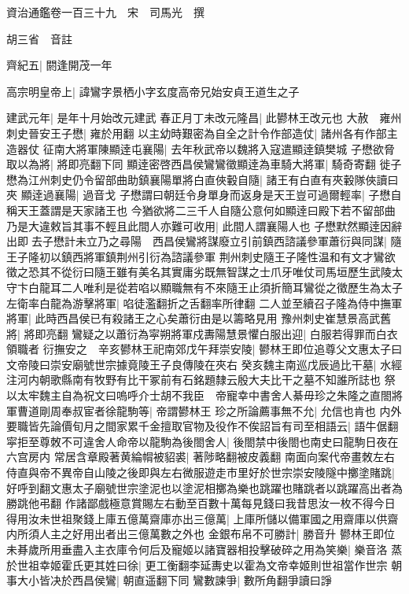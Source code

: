 資治通鑑卷一百三十九　宋　司馬光　撰

胡三省　音註

齊紀五|{
	閼逢開茂一年}


高宗明皇帝上|{
	諱鸞字景栖小字玄度高帝兄始安貞王道生之子}


建武元年|{
	是年十月始改元建武}
春正月丁未改元隆昌|{
	此鬰林王改元也}
大赦　雍州刺史晉安王子懋|{
	雍於用翻}
以主幼時艱密為自全之計令作部造仗|{
	諸州各有作部主造器仗}
征南大將軍陳顯逹屯襄陽|{
	去年秋武帝以魏將入寇遣顯逹鎮樊城}
子懋欲脅取以為將|{
	將即亮翻下同}
顯逹密啓西昌侯鸞鸞徵顯逹為車騎大將軍|{
	騎奇寄翻}
徙子懋為江州刺史仍令留部曲助鎮襄陽單將白直俠轂自隨|{
	諸王有白直有夾轂隊俠讀曰夾}
顯逹過襄陽|{
	過音戈}
子懋謂曰朝廷令身單身而返身是天王豈可過爾輕率|{
	子懋自稱天王蓋謂是天家諸王也}
今猶欲將二三千人自隨公意何如顯逹曰殿下若不留部曲乃是大違敕旨其事不輕且此間人亦難可收用|{
	此間人謂襄陽人也}
子懋默然顯逹因辭出即去子懋計未立乃之尋陽　西昌侯鸞將謀廢立引前鎮西諮議參軍蕭衍與同謀|{
	隨王子隆初以鎮西將軍鎮荆州引衍為諮議參軍}
荆州刺史隨王子隆性温和有文才鸞欲徵之恐其不從衍曰隨王雖有美名其實庸劣既無智謀之士爪牙唯仗司馬垣歷生武陵太守卞白龍耳二人唯利是從若啗以顯職無有不來隨王止須折簡耳鸞從之徵歷生為太子左衛率白龍為游擊將軍|{
	啗徒濫翻折之舌翻率所律翻}
二人並至續召子隆為侍中撫軍將軍|{
	此時西昌侯已有殺諸王之心矣蕭衍由是以籌略見用}
豫州刺史崔慧景高武舊將|{
	將即亮翻}
鸞疑之以蕭衍為寜朔將軍戍夀陽慧景懼白服出迎|{
	白服若得罪而白衣領職者}
衍撫安之　辛亥鬰林王祀南郊戊午拜崇安陵|{
	鬰林王即位追尊父文惠太子曰文帝陵曰崇安廟號世宗據竟陵王子良傳陵在夾右}
癸亥魏主南巡戊辰過比干墓|{
	水經注河内朝歌縣南有牧野有比干冢前有石銘題隸云殷大夫比干之墓不知誰所誌也}
祭以太牢魏主自為祝文曰嗚呼介士胡不我臣　帝寵幸中書舍人綦毋珍之朱隆之直閤將軍曹道剛周奉叔宦者徐龍駒等|{
	帝謂鬰林王}
珍之所論薦事無不允|{
	允信也肯也}
内外要職皆先論價旬月之間家累千金擅取官物及役作不俟詔旨有司至相語云|{
	語牛倨翻}
寜拒至尊敇不可違舍人命帝以龍駒為後閤舍人|{
	後閤禁中後閤也南史曰龍駒日夜在六宫房内}
常居含章殿著黄綸㡌被貂裘|{
	著陟略翻被皮義翻}
南面向案代帝畫敇左右侍直與帝不異帝自山陵之後即與左右微服遊走市里好於世宗崇安陵隧中擲塗賭跳|{
	好呼到翻文惠太子廟號世宗塗泥也以塗泥相擲為樂也跳躍也賭跳者以跳躍高出者為勝跳他弔翻}
作諸鄙戲極意賞賜左右動至百數十萬每見錢曰我昔思汝一枚不得今日得用汝未世祖聚錢上庫五億萬齋庫亦出三億萬|{
	上庫所儲以備軍國之用齋庫以供齋内所須人主之好用出者出三億萬數之外也}
金銀布帛不可勝計|{
	勝音升}
鬰林王即位未朞歲所用垂盡入主衣庫令何后及寵姬以諸寶器相投擊破碎之用為笑樂|{
	樂音洛}
蒸於世祖幸姬霍氏更其姓曰徐|{
	更工衡翻李延夀史以霍為文帝幸姬則世祖當作世宗}
朝事大小皆决於西昌侯鸞|{
	朝直遥翻下同}
鸞數諫爭|{
	數所角翻爭讀曰諍}
